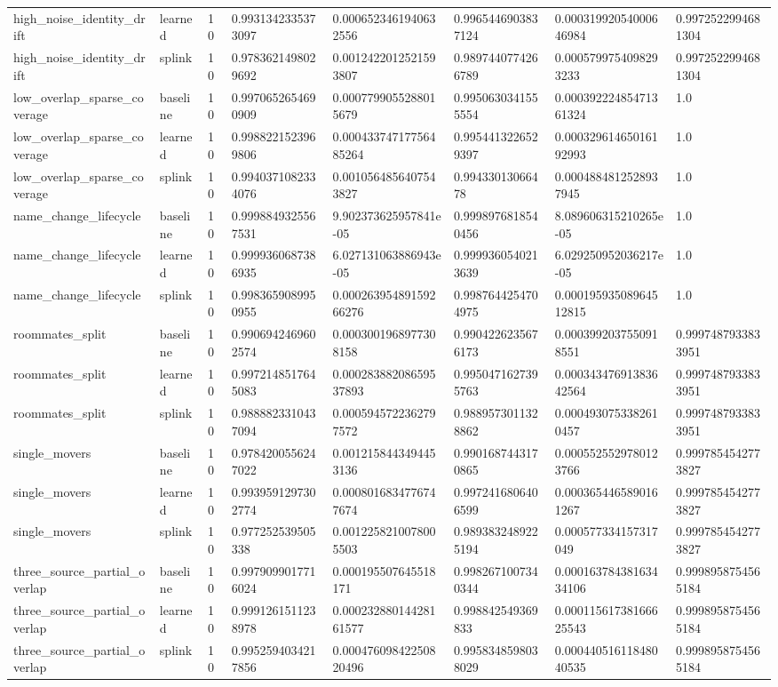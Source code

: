 \begin{longtable}{llllllll}
high\_noise\_identity\_drift & learned & 10 & 0.9931342335373097 & 0.0006523461940632556 & 0.9965446903837124 & 0.00031992054000646984 & 0.9972522994681304 \\
high\_noise\_identity\_drift & splink & 10 & 0.9783621498029692 & 0.0012422012521593807 & 0.9897440774266789 & 0.0005799754098293233 & 0.9972522994681304 \\
low\_overlap\_sparse\_coverage & baseline & 10 & 0.9970652654690909 & 0.0007799055288015679 & 0.9950630341555554 & 0.00039222485471361324 & 1.0 \\
low\_overlap\_sparse\_coverage & learned & 10 & 0.9988221523969806 & 0.00043374717756485264 & 0.9954413226529397 & 0.00032961465016192993 & 1.0 \\
low\_overlap\_sparse\_coverage & splink & 10 & 0.9940371082334076 & 0.0010564856407543827 & 0.99433013066478 & 0.0004884812528937945 & 1.0 \\
name\_change\_lifecycle & baseline & 10 & 0.9998849325567531 & 9.902373625957841e-05 & 0.9998976818540456 & 8.089606315210265e-05 & 1.0 \\
name\_change\_lifecycle & learned & 10 & 0.9999360687386935 & 6.027131063886943e-05 & 0.9999360540213639 & 6.029250952036217e-05 & 1.0 \\
name\_change\_lifecycle & splink & 10 & 0.9983659089950955 & 0.00026395489159266276 & 0.9987644254704975 & 0.00019593508964512815 & 1.0 \\
roommates\_split & baseline & 10 & 0.9906942469602574 & 0.0003001968977308158 & 0.9904226235676173 & 0.0003992037550918551 & 0.9997487933833951 \\
roommates\_split & learned & 10 & 0.9972148517645083 & 0.00028388208659537893 & 0.9950471627395763 & 0.00034347691383642564 & 0.9997487933833951 \\
roommates\_split & splink & 10 & 0.9888823310437094 & 0.0005945722362797572 & 0.9889573011328862 & 0.0004930753382610457 & 0.9997487933833951 \\
single\_movers & baseline & 10 & 0.9784200556247022 & 0.0012158443494453136 & 0.9901687443170865 & 0.0005525529780123766 & 0.9997854542773827 \\
single\_movers & learned & 10 & 0.9939591297302774 & 0.0008016834776747674 & 0.9972416806406599 & 0.0003654465890161267 & 0.9997854542773827 \\
single\_movers & splink & 10 & 0.977252539505338 & 0.0012258210078005503 & 0.9893832489225194 & 0.000577334157317049 & 0.9997854542773827 \\
three\_source\_partial\_overlap & baseline & 10 & 0.9979099017716024 & 0.000195507645518171 & 0.9982671007340344 & 0.00016378438163434106 & 0.9998958754565184 \\
three\_source\_partial\_overlap & learned & 10 & 0.9991261511238978 & 0.00023288014428161577 & 0.998842549369833 & 0.00011561738166625543 & 0.9998958754565184 \\
three\_source\_partial\_overlap & splink & 10 & 0.9952594034217856 & 0.00047609842250820496 & 0.9958348598038029 & 0.00044051611848040535 & 0.9998958754565184 \\
\bottomrule
\end{longtable}
